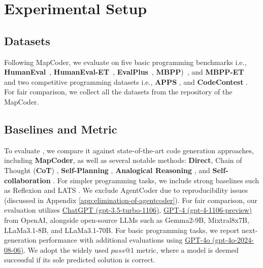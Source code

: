 

\section{Experimental Setup}
\subsection{Datasets}
Following MapCoder, we evaluate \tool on five basic programming benchmarks i.e., \textbf{HumanEval}~\cite{chen2021codex}, \textbf{HumanEval-ET}~\cite{dong2023codescore}, \textbf{EvalPlus}~\cite{evalplus}, \textbf{MBPP})~\cite{austin2021program}, and \textbf{MBPP-ET}~\cite{dong2023codescore} and two competitive programming datasets i.e., \textbf{APPS} \cite{hendrycks2021apps}, and \textbf{CodeContest} \cite{li2022codecontest}. For fair comparison, we collect all the datasets from the repository of the MapCoder. 

\subsection{Baselines and Metric}
\label{sec:baselines-metrics}
To evaluate \toolnospace, we compare it against state-of-the-art code generation approaches, including {\bf MapCoder}, as well as several notable methods: {\bf Direct}, Chain of Thought  (\textbf{CoT}) \cite{wei2022chain}, \textbf{Self-Planning}  \cite{jiang2023self}, \textbf{Analogical Reasoning}  \cite{yasunaga2023large}, and \textbf{Self-collaboration} \cite{dong2023selfcollaboration}. For simpler programming tasks, we include strong baselines such as Reflexion \cite{shinn2023reflexion} and LATS \cite{zhou2023lats}. We exclude AgentCoder \cite{huang2023agentcoder} due to reproducibility issues (discussed in Appendix \ref{app:elimination-of-agentcoder}). 
For fair comparison, our evaluation utilizes \href{https://platform.openai.com/docs/models/gpt-3-5-turbo}{ChatGPT (gpt-3.5-turbo-1106)}, \href{https://platform.openai.com/docs/models/gpt-4-and-gpt-4-turbo}{GPT-4 (gpt-4-1106-preview)} from OpenAI, alongside open-source LLMs such as Gemma2-9B, Mixtral8x7B, LLaMa3.1-8B, and LLaMa3.1-70B. For basic programming tasks, we report next-generation performance with additional evaluations using  \href{https://platform.openai.com/docs/models/gpt-4o}{GPT-4o (gpt-4o-2024-08-06)}. We adopt the widely used $pass@1$ metric, where a model is deemed successful if its sole predicted solution is correct.

